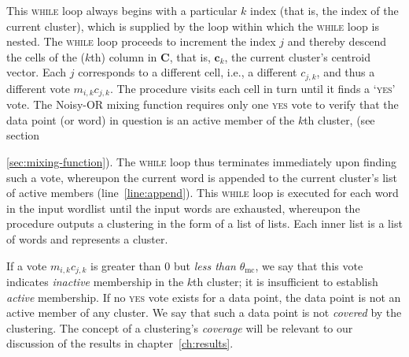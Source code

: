  This \textsc{while} loop always begins with a particular $k$ index (that is, the index of the current cluster), which is supplied 
 by the loop within which the \textsc{while} loop is nested.
 The \textsc{while} loop proceeds to increment the index $j$ and thereby descend the cells of the ($k$th) 
 column in $\mathbf{C}$, that is,  $\mathbf{c}_k$, the current cluster's centroid vector. 
 Each  $j$ corresponds 
 to a different cell, i.e., a different  $c_{j,k}$, and thus a different vote 
 $m_{i,k}c_{j,k}$. 
The procedure visits each cell in turn until it finds a `\textsc{yes}' vote.
The Noisy-OR mixing function requires only one \textsc{yes} vote to verify that the data 
point (or word) in question is an active member of the $k$th cluster,
(see section~{\ref{sec:mixing-function}). The \textsc{while} loop thus terminates immediately upon finding 
 such a vote, whereupon
the current word is appended to the current cluster's list of active members (line~\ref{line:append}). 
This \textsc{while} loop is executed for each word in the input wordlist until the input words are exhausted, whereupon the procedure outputs a clustering in the form of a list of lists. Each inner list is a list of words and represents a cluster. 
 
If a vote $m_{i,k}c_{j,k}$ is greater than $0$ but \emph{less than} $\theta_{\text{mc}}$,
we say that this vote indicates \emph{inactive} membership in the $k$th cluster; it is insufficient to
establish \emph{active} membership. If no \textsc{yes} vote exists for a data point, the data point is not an active member of 
any cluster. We say that such a data point is not \emph{covered} by the clustering.  
The concept of a clustering's \emph{coverage} will be relevant to our discussion of the results in chapter~\ref{ch:results}.
 


}

